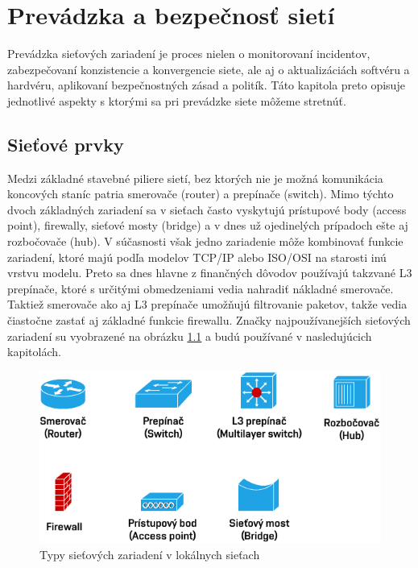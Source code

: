 \chapter{Prevádzka a bezpečnosť sietí}
Prevádzka sieťových zariadení je proces nielen o monitorovaní incidentov, zabezpečovaní konzistencie a konvergencie siete, ale aj o aktualizáciách softvéru a hardvéru, aplikovaní bezpečnostných zásad a politík. Táto kapitola preto opisuje jednotlivé aspekty s ktorými sa pri prevádzke siete môžeme stretnúť.

\section{Sieťové prvky}
\label{hierarchicky-model}
Medzi základné stavebné piliere sietí, bez ktorých nie je možná komunikácia koncových staníc patria smerovače (router) a prepínače (switch). Mimo týchto dvoch základných zariadení sa v  sieťach často vyskytujú prístupové body (access point), firewally, sieťové mosty (bridge) a v dnes už ojedinelých prípadoch ešte aj rozbočovače (hub). V súčasnosti však jedno zariadenie môže kombinovať funkcie zariadení, ktoré majú podľa modelov TCP/IP alebo ISO/OSI na starosti inú vrstvu modelu. Preto sa dnes hlavne z finančných dôvodov používajú takzvané L3 prepínače, ktoré s určitými obmedzeniami vedia nahradiť nákladné smerovače. Taktiež smerovače ako aj L3 prepínače umožňujú filtrovanie paketov, takže vedia čiastočne zastať aj základné funkcie firewallu. Značky najpoužívanejších sieťových zariadení su vyobrazené na obrázku \ref{fig:net-devices} a budú používané v nasledujúcich kapitolách.

\begin{figure}[H]
	\begin{center}
		\includegraphics[scale=1.2]{obrazky/net_devices.pdf}
	\end{center}
	\caption[Typy sieťových zariadení v lokálnych sieťach]{Typy sieťových zariadení v lokálnych sieťach}
	\label{fig:net-devices}
\end{figure} 

